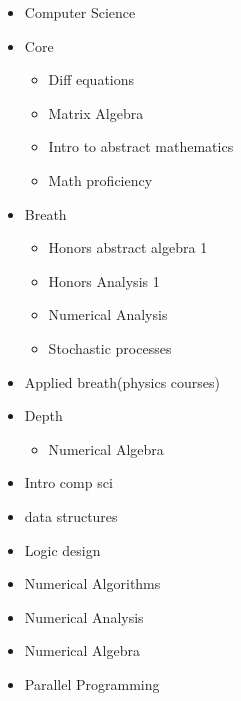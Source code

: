 \begin{itemize}
    \item Computer Science
    \item Core 
    \begin{itemize}
        \item Diff equations
        \item Matrix Algebra
        \item Intro to abstract mathematics
        \item Math proficiency
    \end{itemize}
    \item Breath
    \begin{itemize}
        \item Honors abstract algebra 1
        \item Honors Analysis 1
        \item Numerical Analysis
        \item Stochastic processes
    \end{itemize}
    \item Applied breath(physics courses)
    \item Depth
    \begin{itemize}
        \item Numerical Algebra
    \end{itemize}
\end{itemize}
\begin{itemize}
    \item Intro comp sci
    \item data structures
    \item Logic design
    \item Numerical Algorithms
    \item Numerical Analysis
    \item Numerical Algebra
    \item Parallel Programming
\end{itemize}
